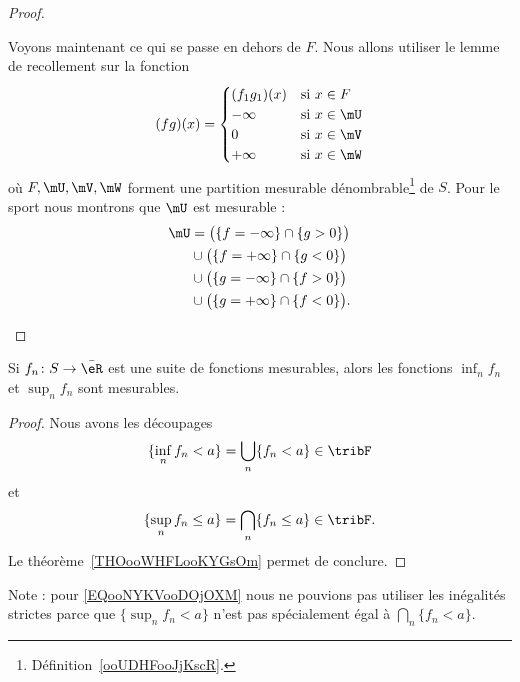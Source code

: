 \begin{proof}
\begin{subproof}
\begin{subproof}
			Voyons maintenant ce qui se passe en dehors de \( F\). Nous allons utiliser le lemme de recollement sur la fonction
			\begin{equation}
				(fg)(x)=\begin{cases}
					(f_1g_1)(x) & \text{si } x\in F   \\
					-\infty     & \text{si } x\in\mU  \\
					0           & \text{si } x\in \mV \\
					+\infty     & \text{si } x\in\mW
				\end{cases}
			\end{equation}
			où \( F,\mU,\mV,\mW\) forment une partition mesurable dénombrable\footnote{Définition~\ref{ooUDHFooJjKscR}.} de \( S\). Pour le sport nous montrons que \( \mU\) est mesurable :
			\begin{subequations}
				\begin{align}
					\mU & =\big( \{ f=-\infty \}\cap\{ g>0 \} \big)    \\
					    & \cup\big( \{ f=+\infty \}\cap\{ g<0 \} \big) \\
					    & \cup\big( \{ g=-\infty \}\cap\{ f>0 \} \big) \\
					    & \cup\big( \{ g=+\infty \}\cap\{ f<0 \}\big).
				\end{align}
			\end{subequations}
		\end{subproof}
	\end{subproof}
\end{proof}



\begin{proposition}     \label{ooABKWooPbfSOZ}
	Si \( f_n\colon S\to \bar \eR\) est une suite de fonctions mesurables, alors les fonctions \( \inf_n f_n\) et \( \sup_nf_n\) sont mesurables.
\end{proposition}

\begin{proof}
	Nous avons les découpages
	\begin{equation}
		\{ \inf_nf_n<a \}=\bigcup_n\{ f_n<a \}\in\tribF
	\end{equation}
	et
	\begin{equation}        \label{EQooNYKVooDOjOXM}
		\{ \sup_nf_n\leq a \}=\bigcap_n\{ f_n\leq a \}\in\tribF.
	\end{equation}
	Le théorème~\ref{THOooWHFLooKYGsOm} permet de conclure.
\end{proof}
Note : pour \eqref{EQooNYKVooDOjOXM} nous ne pouvions pas utiliser les inégalités strictes parce que \( \{ \sup_nf_n<a \}\) n'est pas spécialement égal à \( \bigcap_n\{ f_n<a \}\).

